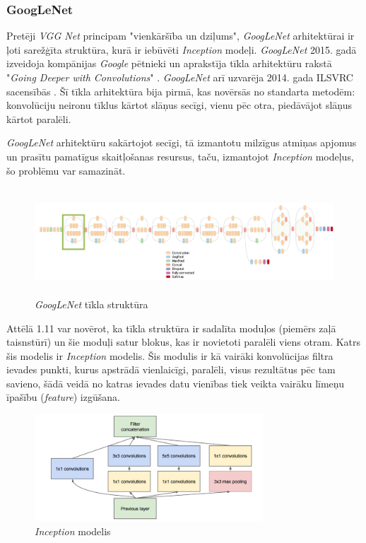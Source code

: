 \subsubsection{GoogLeNet}
Pretēji \textit{VGG Net} principam "vienkāršība un dziļums", \textit{GoogLeNet} arhitektūrai ir ļoti sarežģīta struktūra, kurā ir iebūvēti \textit{Inception} modeļi. \textit{GoogLeNet} 2015. gadā izveidoja kompānijas \textit{Google} pētnieki un aprakstīja tīkla arhitektūru rakstā "\textit{Going Deeper with Convolutions}" \cite{szegedy2015going}. \textit{GoogLeNet} arī uzvarēja 2014. gada ILSVRC sacensībās \cite{ILSVRC15}. Šī tīkla arhitektūra bija pirmā, kas novērsās no standarta metodēm: konvolūciju neironu tīklus kārtot slāņus secīgi, vienu pēc otra, piedāvājot slāņus kārtot paralēli.

\textit{GoogLeNet} arhitektūru sakārtojot secīgi, tā izmantotu milzīgus atmiņas apjomus un prasītu pamatīgus skaitļošanas resursus, taču, izmantojot \textit{Inception} modeļus, šo problēmu var samazināt.
\begin{figure}[h]%
	\centering
	\includegraphics[height=4cm]{images/GoogLeNet2.png} %
	\caption{\textit{GoogLeNet} tīkla struktūra \cite{szegedy2015going}}%
	\label{fig:example}%
\end{figure}

Attēlā 1.11 var novērot, ka tīkla struktūra ir sadalīta moduļos (piemērs zaļā taisnstūrī) un šie moduļi satur blokus, kas ir novietoti paralēli viens otram. Katrs šis modelis ir \textit{Inception} modelis. Šis modulis ir kā vairāki konvolūcijas filtra ievades punkti, kurus apstrādā vienlaicīgi, paralēli, visus rezultātus pēc tam savieno, šādā veidā no katras ievades datu vienības tiek veikta vairāku līmeņu īpašību (\textit{feature}) izgūšana.

\begin{figure}[h]%
	\centering
	\includegraphics[height=4cm]{images/inception.png} %
	\caption{\textit{Inception} modelis \cite{szegedy2015going}}%
	\label{fig:example}%
\end{figure}

